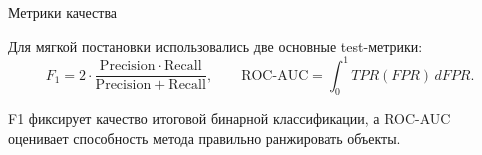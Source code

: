 \SPBGContentSlide
  {Метрики качества}
  {%
    \FormulaBody
    Для мягкой постановки использовались две основные test-метрики:
    \[
      F_1=
      2\cdot
      \frac{\mathrm{Precision}\cdot\mathrm{Recall}}
      {\mathrm{Precision}+\mathrm{Recall}},
      \qquad
      \mathrm{ROC\text{-}AUC}
      =
      \int_0^1 TPR(FPR)\,dFPR.
    \]

    \vspace{.15cm}
    \Body
    F1 фиксирует качество итоговой бинарной классификации,
    а ROC-AUC оценивает способность метода правильно ранжировать объекты.
  }
